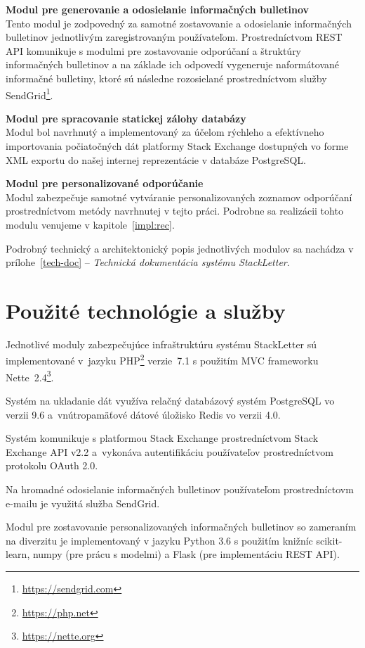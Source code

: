 \textbf{Modul pre generovanie a odosielanie informačných bulletinov}\\
Tento modul je zodpovedný za samotné zostavovanie a odosielanie informačných bulletinov jednotlivým zaregistrovaným
používateľom. Prostredníctvom REST API komunikuje s modulmi pre zostavovanie odporúčaní a štruktúry informačných bulletinov
a na základe ich odpovedí vygeneruje naformátované informačné bulletiny, ktoré sú následne rozosielané prostredníctvom služby
SendGrid\footnote{\url{https://sendgrid.com}}.

\textbf{Modul pre spracovanie statickej zálohy databázy}\\
Modul bol navrhnutý a implementovaný za účelom rýchleho a efektívneho importovania počiatočných dát platformy Stack Exchange
dostupných vo forme XML exportu do našej internej reprezentácie v databáze PostgreSQL.

\textbf{Modul pre personalizované odporúčanie}\\
Modul zabezpečuje samotné vytváranie personalizovaných zoznamov odporúčaní prostredníctvom metódy navrhnutej v tejto práci.
Podrobne sa realizácii tohto modulu venujeme v kapitole~\ref{impl:rec}.

Podrobný technický a architektonický popis jednotlivých modulov sa nachádza
v prílohe~\ref{tech-doc} -- \textit{Technická dokumentácia systému StackLetter}.

\section{Použité technológie a služby}

\begin{my_itemize}
\item{Jednotlivé moduly zabezpečujúce infraštruktúru systému StackLetter sú implementované v~jazyku PHP\footnote{\url{https://php.net}}
verzie~7.1 s použitím MVC frameworku Nette~2.4\footnote{\url{https://nette.org}}.}
\item{Systém na ukladanie dát využíva relačný databázový systém PostgreSQL vo verzii 9.6 a~vnútropamäťové dátové úložisko Redis
vo verzii 4.0.}
\item{Systém komunikuje s platformou Stack Exchange prostredníctvom Stack Exchange API v2.2 a~vykonáva autentifikáciu
používateľov prostredníctvom protokolu OAuth 2.0.}
\item{Na hromadné odosielanie informačných bulletinov používateľom prostredníctovm e-mailu je využitá služba SendGrid.}
\item{Modul pre zostavovanie personalizovaných informačných bulletinov so zameraním na diverzitu je implementovaný
v jazyku Python 3.6 s použitím knižníc scikit-learn, numpy (pre prácu s modelmi) a Flask (pre implementáciu REST API).}
\end{my_itemize}


